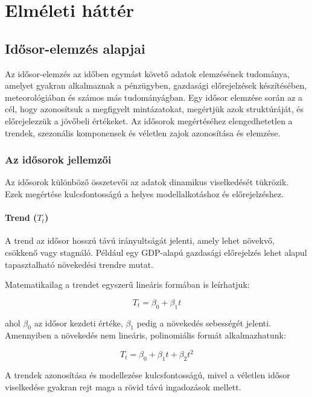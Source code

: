 \documentclass[11pt]{article}
\begin{document}
    \section{Elméleti háttér}\label{elmuxe9leti-huxe1ttuxe9r}

    \subsection{Idősor-elemzés alapjai}\label{idux151sor-elemzuxe9s-alapjai}

Az idősor-elemzés az időben egymást követő adatok elemzésének tudománya,
amelyet gyakran alkalmaznak a pénzügyben, gazdasági előrejelzések
készítésében, meteorológiában és számos más tudományágban. Egy idősor
elemzése során az a cél, hogy azonosítsuk a megfigyelt mintázatokat,
megértjük azok struktúráját, és előrejelezzük a jövőbeli értékeket. Az
idősorok megértéséhez elengedhetetlen a trendek, szezonális komponensek
és véletlen zajok azonosítása és elemzése.

    \subsubsection{Az idősorok
jellemzői}\label{az-idux151sorok-jellemzux151i}

Az idősorok különböző összetevői az adatok dinamikus viselkedését
tükrözik. Ezek megértése kulcsfontosságú a helyes modellalkotáshoz és
előrejelzéshez.

\paragraph{\texorpdfstring{Trend
(\(T_t\))}{Trend (T\_t)}}\label{trend-t_t}

A trend az idősor hosszú távú irányultságát jelenti, amely lehet
növekvő, csökkenő vagy stagnáló. Például egy GDP-alapú gazdasági
előrejelzés lehet alapul tapasztalható növekedési trendre mutat.

Matematikailag a trendet egyszerű lineáris formában is leírhatjuk:

\[T_t = \beta_0 + \beta_1 t\]

ahol \(\beta_0\) az idősor kezdeti értéke, \(\beta_1\) pedig a növekedés
sebességét jelenti. Amennyiben a növekedés nem lineáris, polinomiális
formát alkalmazhatunk:

\[T_t = \beta_0 + \beta_1 t + \beta_2 t^2\]

A trendek azonosítása és modellezése kulcsfontosságú, mivel a véletlen
idősor viselkedése gyakran rejt maga a rövid távú ingadozások mellett.
\end{document}
